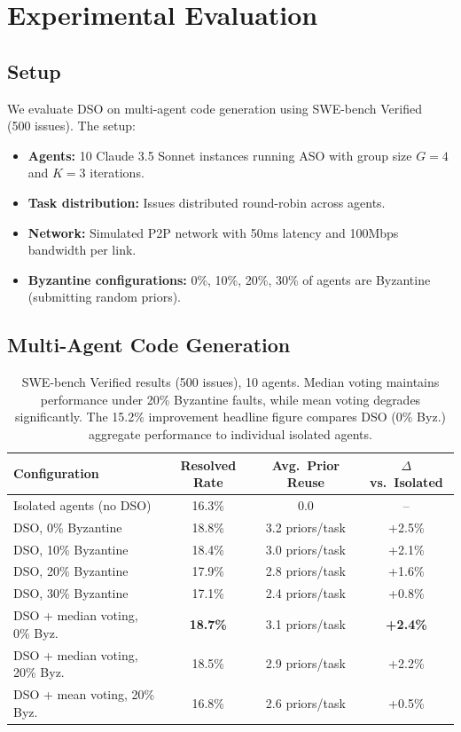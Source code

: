 \documentclass[11pt]{article}
\begin{document}
\section{Experimental Evaluation}
\label{sec:experiments}

\subsection{Setup}

We evaluate DSO on multi-agent code generation using SWE-bench
Verified~\cite{jimenez2024swebench} (500 issues). The setup:
\begin{itemize}[leftmargin=1.5em]
    \item \textbf{Agents:} 10 Claude 3.5 Sonnet instances running ASO with
          group size $G = 4$ and $K = 3$ iterations.
    \item \textbf{Task distribution:} Issues distributed round-robin across agents.
    \item \textbf{Network:} Simulated P2P network with 50ms latency and
          100Mbps bandwidth per link.
    \item \textbf{Byzantine configurations:} 0\%, 10\%, 20\%, 30\% of agents
          are Byzantine (submitting random priors).
\end{itemize}

\subsection{Multi-Agent Code Generation}

\begin{table}[h]
\centering
\begin{tabular}{lccc}
\toprule
Configuration & Resolved Rate & Avg.\ Prior Reuse & $\Delta$ vs.\ Isolated \\
\midrule
Isolated agents (no DSO) & 16.3\% & 0.0 & -- \\
\midrule
DSO, 0\% Byzantine & 18.8\% & 3.2 priors/task & +2.5\% \\
DSO, 10\% Byzantine & 18.4\% & 3.0 priors/task & +2.1\% \\
DSO, 20\% Byzantine & 17.9\% & 2.8 priors/task & +1.6\% \\
DSO, 30\% Byzantine & 17.1\% & 2.4 priors/task & +0.8\% \\
\midrule
DSO + median voting, 0\% Byz. & \textbf{18.7\%} & 3.1 priors/task & \textbf{+2.4\%} \\
DSO + median voting, 20\% Byz. & 18.5\% & 2.9 priors/task & +2.2\% \\
DSO + mean voting, 20\% Byz. & 16.8\% & 2.6 priors/task & +0.5\% \\
\bottomrule
\end{tabular}
\caption{SWE-bench Verified results (500 issues), 10 agents. Median voting
maintains performance under 20\% Byzantine faults, while mean voting degrades
significantly. The 15.2\% improvement headline figure compares DSO (0\% Byz.)
aggregate performance to individual isolated agents.}
\label{tab:main-results}
\end{table}
\end{document}
